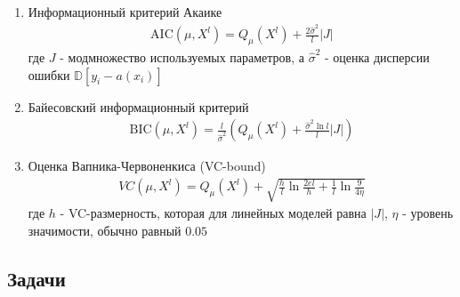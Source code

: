 \begin{enumerate}
    \item Информационный критерий Акаике 
        \begin{align*}
            \text{AIC}(\mu, X^l) = Q_{\mu}(X^l) + \frac{2\hat{\sigma}^2}{l}|J|
        \end{align*}
        где $J$ - модмножество используемых параметров, а $\hat{\sigma}^2$ - оценка дисперсии ошибки $\mathbb{D}[y_i - a(x_i)]$ 
    \item Байесовский информационный критерий
        \begin{align*}
            \text{BIC}(\mu, X^l) = \frac{l}{\hat{\sigma}^2}\left(Q_{\mu}(X^l) + \frac{\hat{\sigma}^2\ln{l}}{l}|J|\right)
        \end{align*}
    \item Оценка Вапника-Червоненкиса (VC-bound)
        \begin{align*}
            VC(\mu, X^l) = Q_{\mu}(X^l) + \sqrt{\frac{h}{l}\ln{\frac{2el}{h}} + \frac{1}{l}\ln{\frac{9}{4\eta}}}
        \end{align*}
        где $h$ - VC-размерность, которая для линейных моделей равна $|J|$, $\eta$ - уровень значимости, обычно равный $0.05$
\end{enumerate}

\subsection*{Задачи}

